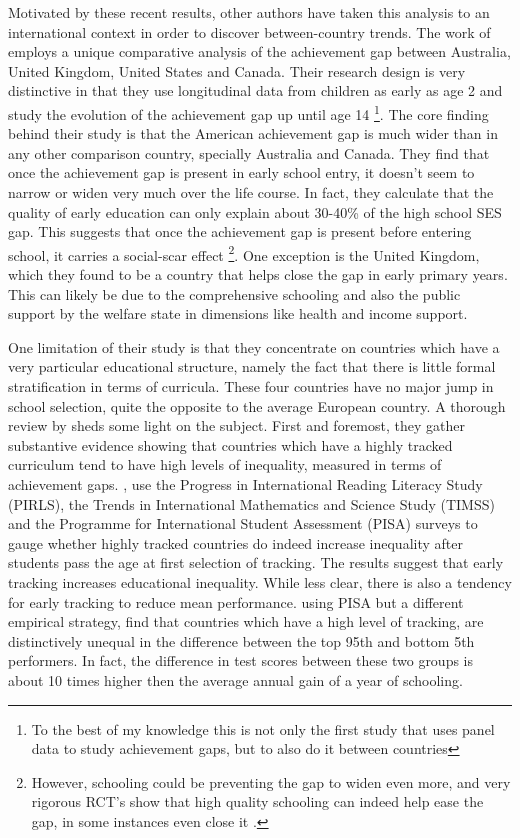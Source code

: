 \documentclass[11pt, a4paper]{article}\usepackage[]{graphicx}\usepackage[]{color}
\begin{document}
  Motivated by these recent results, other authors have taken this analysis to an international context in order to discover between-country trends. The work of \citet{bradbury2015} employs a unique comparative analysis of the achievement gap between Australia, United Kingdom, United States and Canada. Their research design is very distinctive in that they use longitudinal data from children as early as age 2 and study the evolution of the achievement gap up until age 14 \footnote{To the best of my knowledge this is not only the first study that uses panel data to study achievement gaps, but to also do it between countries}. The core finding behind their study is that the American achievement gap is much wider than in any other comparison country, specially Australia and Canada. They find that once the achievement gap is present in early school entry, it doesn't seem to narrow or widen very much over the life course. In fact, they calculate that the quality of early education can only explain about  30-40\% of the high school SES gap. This suggests that once the achievement gap is present before entering school, it carries a social-scar effect \footnote{However, schooling could be preventing the gap to widen even more, and very rigorous RCT's show that high quality schooling can indeed help ease the gap, in some instances even close it \citep{campbell2002}.}. One exception is the United Kingdom, which they found to be a country that helps close the gap in early primary years. This can likely be due to the comprehensive schooling and also the public support by the welfare state in dimensions like health and income support.

One limitation of their study is that they concentrate on countries which have a very particular educational structure, namely the fact that there is little formal stratification in terms of curricula. These four countries have no major jump in school selection, quite the opposite to the average European country. A thorough review by \citet{werfhorst_mijs} sheds some light on the subject. First and foremost, they gather substantive evidence showing that countries which have a highly tracked curriculum tend to have high levels of inequality, measured in terms of achievement gaps. \citet{hanushek_woesmann_tracking}, use the Progress in International Reading Literacy Study (PIRLS), the Trends in International Mathematics and Science Study (TIMSS) and the Programme for International Student Assessment (PISA) surveys to gauge whether highly tracked countries do indeed increase inequality after students pass the age at first selection of tracking. The results suggest that early tracking increases educational inequality. While less clear, there is also a tendency for early tracking to reduce mean performance. \citet{micklewright} using PISA but a different empirical strategy, find that countries which have a high level of tracking, are distinctively unequal in the difference between the top 95th and bottom 5th performers. In fact, the difference in test scores between these two groups is about 10 times higher then the average annual gain of a year of schooling.
\end{document}

